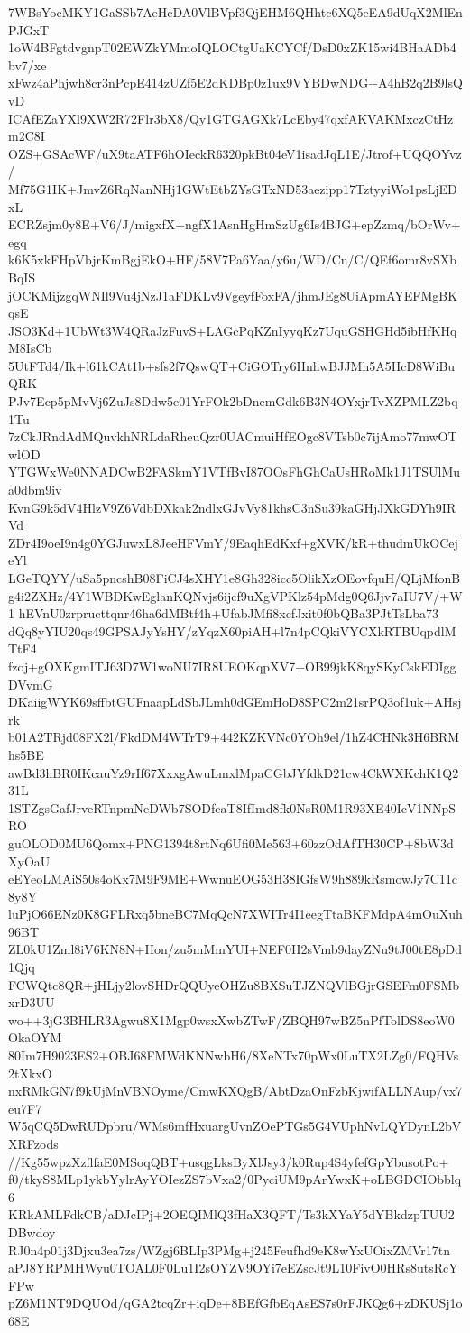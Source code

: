7WBsYocMKY1GaSSb7AeHcDA0VlBVpf3QjEHM6QHhtc6XQ5eEA9dUqX2MlEnPJGxT
1oW4BFgtdvgnpT02EWZkYMmoIQLOCtgUaKCYCf/DsD0xZK15wi4BHaADb4bv7/xe
xFwz4aPhjwh8cr3nPcpE414zUZf5E2dKDBp0z1ux9VYBDwNDG+A4hB2q2B9lsQvD
ICAfEZaYXl9XW2R72Flr3bX8/Qy1GTGAGXk7LcEby47qxfAKVAKMxczCtHzm2C8I
OZS+GSAcWF/uX9taATF6hOIeckR6320pkBt04eV1isadJqL1E/Jtrof+UQQOYvz/
Mf75G1IK+JmvZ6RqNanNHj1GWtEtbZYsGTxND53aezipp17TztyyiWo1psLjEDxL
ECRZsjm0y8E+V6/J/migxfX+ngfX1AsnHgHmSzUg6Is4BJG+epZzmq/bOrWv+egq
k6K5xkFHpVbjrKmBgjEkO+HF/58V7Pa6Yaa/y6u/WD/Cn/C/QEf6omr8vSXbBqIS
jOCKMijzgqWNIl9Vu4jNzJ1aFDKLv9VgeyfFoxFA/jhmJEg8UiApmAYEFMgBKqsE
JSO3Kd+1UbWt3W4QRaJzFuvS+LAGcPqKZnIyyqKz7UquGSHGHd5ibHfKHqM8IsCb
5UtFTd4/Ik+l61kCAt1b+sfs2f7QswQT+CiGOTry6HnhwBJJMh5A5HcD8WiBuQRK
PJv7Ecp5pMvVj6ZuJs8Ddw5e01YrFOk2bDnemGdk6B3N4OYxjrTvXZPMLZ2bq1Tu
7zCkJRndAdMQuvkhNRLdaRheuQzr0UACmuiHfEOgc8VTsb0c7ijAmo77mwOTwlOD
YTGWxWe0NNADCwB2FASkmY1VTfBvI87OOsFhGhCaUsHRoMk1J1TSUlMua0dbm9iv
KvnG9k5dV4HlzV9Z6VdbDXkak2ndlxGJvVy81khsC3nSu39kaGHjJXkGDYh9IRVd
ZDr4I9oeI9n4g0YGJuwxL8JeeHFVmY/9EaqhEdKxf+gXVK/kR+thudmUkOCejeYl
LGeTQYY/uSa5pncshB08FiCJ4sXHY1e8Gh328icc5OlikXzOEovfquH/QLjMfonB
g4i2ZXHz/4Y1WBDKwEglanKQNvjs6ijcf9uXgVPKlz54pMdg0Q6Jjv7aIU7V/+W1
hEVnU0zrpructtqnr46ha6dMBtf4h+UfabJMfi8xcfJxit0f0bQBa3PJtTsLba73
dQq8yYIU20qs49GPSAJyYsHY/zYqzX60piAH+l7n4pCQkiVYCXkRTBUqpdlMTtF4
fzoj+gOXKgmITJ63D7W1woNU7IR8UEOKqpXV7+OB99jkK8qySKyCskEDIggDVvmG
DKaiigWYK69sffbtGUFnaapLdSbJLmh0dGEmHoD8SPC2m21srPQ3of1uk+AHsjrk
b01A2TRjd08FX2l/FkdDM4WTrT9+442KZKVNc0YOh9el/1hZ4CHNk3H6BRMhs5BE
awBd3hBR0IKcauYz9rIf67XxxgAwuLmxlMpaCGbJYfdkD21cw4CkWXKchK1Q231L
1STZgsGafJrveRTnpmNeDWb7SODfeaT8IfImd8fk0NsR0M1R93XE40IcV1NNpSRO
guOLOD0MU6Qomx+PNG1394t8rtNq6Ufi0Me563+60zzOdAfTH30CP+8bW3dXyOaU
eEYeoLMAiS50s4oKx7M9F9ME+WwnuEOG53H38IGfsW9h889kRsmowJy7C11c8y8Y
luPjO66ENz0K8GFLRxq5bneBC7MqQcN7XWITr4I1eegTtaBKFMdpA4mOuXuh96BT
ZL0kU1Zml8iV6KN8N+Hon/zu5mMmYUI+NEF0H2sVmb9dayZNu9tJ00tE8pDd1Qjq
FCWQtc8QR+jHLjy2lovSHDrQQUyeOHZu8BXSuTJZNQVlBGjrGSEFm0FSMbxrD3UU
wo++3jG3BHLR3Agwu8X1Mgp0wsxXwbZTwF/ZBQH97wBZ5nPfTolDS8eoW0OkaOYM
80Im7H9023ES2+OBJ68FMWdKNNwbH6/8XeNTx70pWx0LuTX2LZg0/FQHVs2tXkxO
nxRMkGN7f9kUjMnVBNOyme/CmwKXQgB/AbtDzaOnFzbKjwifALLNAup/vx7eu7F7
W5qCQ5DwRUDpbru/WMs6mfHxuargUvnZOePTGs5G4VUphNvLQYDynL2bVXRFzods
//Kg55wpzXzflfaE0MSoqQBT+usqgLksByXlJsy3/k0Rup4S4yfefGpYbusotPo+
f0/tkyS8MLp1ykbYylrAyYOIezZS7bVxa2/0PyciUM9pArYwxK+oLBGDCIObblq6
KRkAMLFdkCB/aDJcIPj+2OEQIMlQ3fHaX3QFT/Ts3kXYaY5dYBkdzpTUU2DBwdoy
RJ0n4p01j3Djxu3ea7zs/WZgj6BLIp3PMg+j245Feufhd9eK8wYxUOixZMVr17tn
aPJ8YRPMHWyu0TOAL0F0Lu1I2sOYZV9OYi7eEZscJt9L10FivO0HRs8utsRcYFPw
pZ6M1NT9DQUOd/qGA2tcqZr+iqDe+8BEfGfbEqAsES7s0rFJKQg6+zDKUSj1o68E
